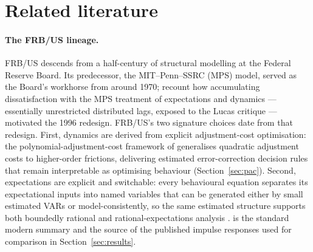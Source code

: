 \section{Related literature}
\label{sec:literature}

\paragraph{The FRB/US lineage.} FRB/US descends from a half-century of structural modelling at the Federal Reserve Board. Its predecessor, the MIT--Penn--SSRC (MPS) model, served as the Board's workhorse from around 1970; \citet{brayton1997evolution} recount how accumulating dissatisfaction with the MPS treatment of expectations and dynamics --- essentially unrestricted distributed lags, exposed to the Lucas critique --- motivated the 1996 redesign. FRB/US's two signature choices date from that redesign. First, dynamics are derived from explicit adjustment-cost optimisation: the polynomial-adjustment-cost framework of \citet{tinsley1993, tinsley2002} generalises quadratic adjustment costs to higher-order frictions, delivering estimated error-correction decision rules that remain interpretable as optimising behaviour (Section~\ref{sec:pac}). Second, expectations are explicit and switchable: every behavioural equation separates its expectational inputs into named variables that can be generated either by small estimated VARs or model-consistently, so the same estimated structure supports both boundedly rational and rational-expectations analysis \citep{brayton1997role}. \citet{brayton2014note} is the standard modern summary and the source of the published impulse responses used for comparison in Section~\ref{sec:results}.

